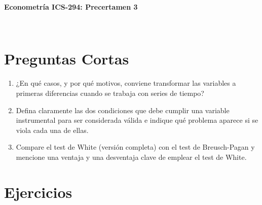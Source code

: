 \documentclass[10pt,a4paper]{article}
\begin{document}
\vspace{5cm}





\begin{center}
\begin{large}
\textbf{Econometría ICS-294: Precertamen 3}
\end{large}\\
\vspace{0.2cm}
\end{center}

\section{Preguntas Cortas }

\begin{enumerate}

\item  ¿En qué casos, y por qué motivos, conviene transformar las variables a primeras diferencias cuando se trabaja con series de tiempo?
\\

\item  Defina claramente las dos condiciones que debe cumplir una variable instrumental para ser considerada válida e indique qué problema aparece si se viola cada una de ellas.  \\


\item  Compare el test de White (versión completa) con el test de Breusch-Pagan y mencione una ventaja y una desventaja clave de emplear el test de White.\\

\end{enumerate}

\section{Ejercicios }
\end{document}
